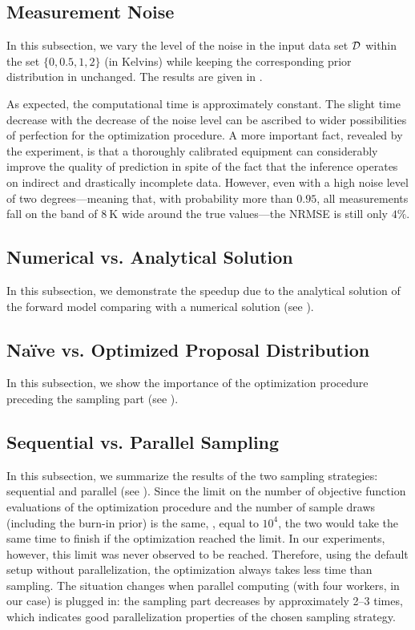 \subsection{Measurement Noise}
In this subsection, we vary the level of the noise in the input data set $\mathcal{D}$ within the set $\{ 0, 0.5, 1, 2 \}$ (in Kelvins) while keeping the corresponding prior distribution in  unchanged. The results are given in .


As expected, the computational time is approximately constant. The slight time decrease with the decrease of the noise level can be ascribed to wider possibilities of perfection for the optimization procedure. A more important fact, revealed by the experiment, is that a thoroughly calibrated equipment can considerably improve the quality of prediction in spite of the fact that the inference operates on indirect and drastically incomplete data. However, even with a high noise level of two degrees---meaning that, with probability more than $0.95$, all measurements fall on the band of $8~\text{K}$ wide around the true values---the NRMSE is still only $4\%$.

\subsection{Numerical vs. Analytical Solution}
In this subsection, we demonstrate the speedup due to the analytical solution of the forward model comparing with a numerical solution (see ).

\subsection{Na\"{i}ve vs. Optimized Proposal Distribution}
In this subsection, we show the importance of the optimization procedure preceding the sampling part (see ).

\subsection{Sequential vs. Parallel Sampling}
In this subsection, we summarize the results of the two sampling strategies: sequential and parallel (see ). Since the limit on the number of objective function evaluations of the optimization procedure and the number of sample draws (including the burn-in prior) is the same, \ie, equal to $10^4$, the two would take the same time to finish if the optimization reached the limit. In our experiments, however, this limit was never observed to be reached. Therefore, using the default setup without parallelization, the optimization always takes less time than sampling. The situation changes when parallel computing (with four workers, in our case) is plugged in: the sampling part decreases by approximately 2–3 times, which indicates good parallelization properties of the chosen sampling strategy.
